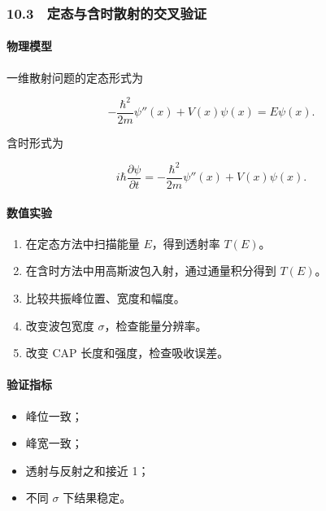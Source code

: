\documentclass[
]{ctexbook}
\providecommand{\tightlist}{%
  \setlength{\itemsep}{0pt}\setlength{\parskip}{0pt}}
\begin{document}
\hypertarget{ux5b9aux6001ux4e0eux542bux65f6ux6563ux5c04ux7684ux4ea4ux53c9ux9a8cux8bc1}{%
\subsubsection{10.3　定态与含时散射的交叉验证}\label{ux5b9aux6001ux4e0eux542bux65f6ux6563ux5c04ux7684ux4ea4ux53c9ux9a8cux8bc1}}

\hypertarget{ux7269ux7406ux6a21ux578b-2}{%
\paragraph{物理模型}\label{ux7269ux7406ux6a21ux578b-2}}

一维散射问题的定态形式为

\[
-\frac{\hbar^2}{2m}\psi''(x)+V(x)\psi(x)=E\psi(x).
\]

含时形式为

\[
i\hbar\frac{\partial\psi}{\partial t}
=
-\frac{\hbar^2}{2m}\psi''(x)+V(x)\psi(x).
\]

\hypertarget{ux6570ux503cux5b9eux9a8c-3}{%
\paragraph{数值实验}\label{ux6570ux503cux5b9eux9a8c-3}}

\begin{enumerate}
\def\labelenumi{\arabic{enumi}.}
\tightlist
\item
  在定态方法中扫描能量 \(E\)，得到透射率 \(T(E)\)。
\item
  在含时方法中用高斯波包入射，通过通量积分得到 \(T(E)\)。
\item
  比较共振峰位置、宽度和幅度。
\item
  改变波包宽度 \(\sigma\)，检查能量分辨率。
\item
  改变 CAP 长度和强度，检查吸收误差。
\end{enumerate}

\hypertarget{ux9a8cux8bc1ux6307ux6807-2}{%
\paragraph{验证指标}\label{ux9a8cux8bc1ux6307ux6807-2}}

\begin{itemize}
\tightlist
\item
  峰位一致；
\item
  峰宽一致；
\item
  透射与反射之和接近 1；
\item
  不同 \(\sigma\) 下结果稳定。
\end{itemize}
\end{document}
